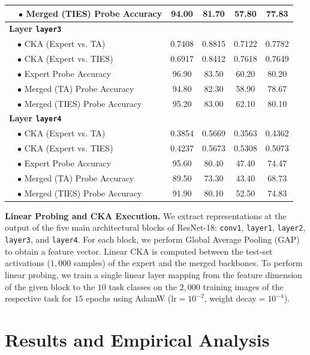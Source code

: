 \documentclass{article}
\theoremstyle{plain}
\theoremstyle{definition}
\theoremstyle{remark}
\begin{document}
\begin{table}[t]
\begin{tabular}{lcccc}
    ~~$\bullet$ Merged (TIES) Probe Accuracy & 94.00 & 81.70 & 57.80 & 77.83 \\
    \midrule
    \textbf{Layer \texttt{layer3}} & & & & \\
    ~~$\bullet$ CKA (Expert vs. TA) & 0.7408 & 0.8815 & 0.7122 & 0.7782 \\
    ~~$\bullet$ CKA (Expert vs. TIES) & 0.6917 & 0.8412 & 0.7618 & 0.7649 \\
    ~~$\bullet$ Expert Probe Accuracy & 96.90 & 83.50 & 60.20 & 80.20 \\
    ~~$\bullet$ Merged (TA) Probe Accuracy & 94.80 & 82.30 & 58.90 & 78.67 \\
    ~~$\bullet$ Merged (TIES) Probe Accuracy & 95.20 & 83.00 & 62.10 & 80.10 \\
    \midrule
    \textbf{Layer \texttt{layer4}} & & & & \\
    ~~$\bullet$ CKA (Expert vs. TA) & 0.3854 & 0.5669 & 0.3563 & 0.4362 \\
    ~~$\bullet$ CKA (Expert vs. TIES) & 0.4237 & 0.5673 & 0.5308 & 0.5073 \\
    ~~$\bullet$ Expert Probe Accuracy & 95.60 & 80.40 & 47.40 & 74.47 \\
    ~~$\bullet$ Merged (TA) Probe Accuracy & 89.50 & 73.30 & 43.40 & 68.73 \\
    ~~$\bullet$ Merged (TIES) Probe Accuracy & 91.90 & 80.10 & 52.50 & 74.83 \\
    \bottomrule
  \end{tabular}
\end{table}\vspace{-3.5mm}

\textbf{Linear Probing and CKA Execution.} We extract representations at the output of the five main architectural blocks of ResNet-18: \texttt{conv1}, \texttt{layer1}, \texttt{layer2}, \texttt{layer3}, and \texttt{layer4}.
For each block, we perform Global Average Pooling (GAP) to obtain a feature vector. Linear CKA is computed between the test-set activations ($1,000$ samples) of the expert and the merged backbones.
To perform linear probing, we train a single linear layer mapping from the feature dimension of the given block to the $10$ task classes on the $2,000$ training images of the respective task for $15$ epochs using AdamW (lr$=10^{-2}$, weight decay$=10^{-4}$).

\vspace{-2mm}
\section{Results and Empirical Analysis}
\label{sec:results}
\end{document}
